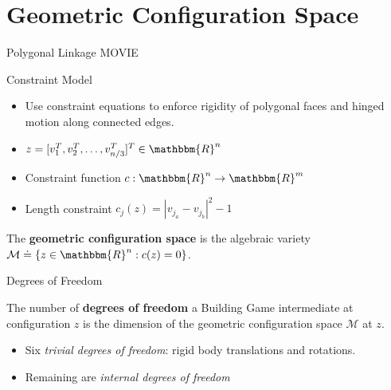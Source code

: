 \documentclass{beamer}
\begin{document}
\section{Geometric Configuration Space}
\begin{frame}{Polygonal Linkage}
MOVIE
\end{frame}
\begin{frame}{Constraint Model}
\begin{itemize}
\item Use constraint equations to enforce rigidity of polygonal faces and hinged motion along connected edges.
\item $z = [v_1^T, v_2^T, \dots, v_{n/3}^T]^T \in \mathbbm{R}^n$
\item Constraint function $c: \mathbbm{R}^n \to \mathbbm{R}^m$
\item Length constraint $c_j(z) = |v_{j_a} - v_{j_b}|^2 - 1$
\end{itemize}
\begin{definition}
The \textbf{geometric configuration space} is the algebraic variety $\mathcal{M} \doteq \{z \in \mathbbm{R}^n: c(z) = 0\}$. 
\end{definition}

\end{frame}
\begin{frame}{Degrees of Freedom}
\begin{definition}
The number of \textbf{degrees of freedom} a Building Game intermediate at configuration $z$ is the dimension of the geometric configuration space $\mathcal{M}$ at $z$. 
\end{definition}
\begin{itemize}
\item Six \textit{trivial degrees of freedom}: rigid body translations and rotations. 
\item Remaining are \textit{internal degrees of freedom}
\end{itemize}
\end{frame}
\end{document}
